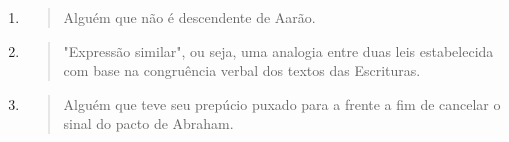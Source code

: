 \begin{enumerate}
\def\labelenumi{\arabic{enumi}.}
\setcounter{enumi}{298}
\item
  \begin{quote}
  Alguém que não é descendente de Aarão.
  \end{quote}
\item
  \begin{quote}
  "Expressão similar", ou seja, uma analogia entre duas leis
  estabelecida com base na congruência verbal dos textos das Escrituras.
  \end{quote}
\item
  \begin{quote}
  Alguém que teve seu prepúcio puxado para a frente a fim de cancelar o
  sinal do pacto de Abraham.
  \end{quote}
\end{enumerate}

